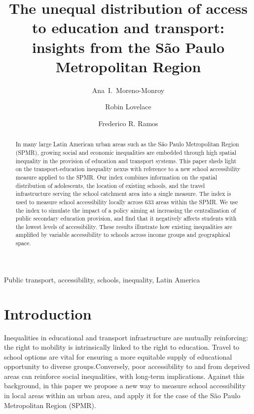 \documentclass[3p,authoryear,preprint,review,12pt]{elsarticle}
\begin{document}
\begin{frontmatter}
 \title{The unequal distribution of access to education and transport: insights from the São Paulo Metropolitan Region}
   
  \author[uab]{Ana~I.~Moreno-Monroy}
 
  \author[uol]{Robin Lovelace}
  
   \author[fgv]{Frederico R. Ramos}
  
 \address[urv]{Applied Economics Department, Autonomous University of Barcelona}
  \address[uol]{Intitute of Trasnport Studies, University of Leeds}
 \address[fgv]{CEPESP, Fundação Getulio Vargas}

\begin{abstract}
In many large Latin American urban areas such as the São Paulo
Metropolitan Region (SPMR), growing social and economic inequalities are embedded through high spatial inequality in the provision of education and transport systems. This paper sheds light on the transport-education inequality nexus with reference to a new school accessibility measure applied to the SPMR. Our index combines information on the spatial distribution of adolescents, the location of existing schools, and the travel infrastructure serving the school catchment area into a single measure. The index is used to measure school accessibility locally across 633 areas within the SPMR. We use the index to simulate the impact of a policy aiming at increasing the centralization of public secondary education provision, and find that it negatively affects students with the lowest levels of accessibility. These results illustrate how existing inequalities are amplified by variable accessibility to schools across income groups and geographical space.
\end{abstract}


\begin{keyword}
Public transport, accessibility, schools, inequality, Latin America\\
\end{keyword}

\end{frontmatter}

\newpage
\section{Introduction}\label{introduction}

Inequalities in educational and transport infrastructure are mutually reinforcing: the right to mobility is intrinsically linked to the right to education. Travel to school options are vital for ensuring a more equitable supply of educational opportunity to diverse groups.Conversely, poor accessibility to and from deprived areas can reinforce social inequalities, with long-term implications. Against this background, in this paper we propose a new way to measure school accessibility in local areas within an urban area, and apply it for the case of the São Paulo Metropolitan Region (SPMR).
\end{document}
